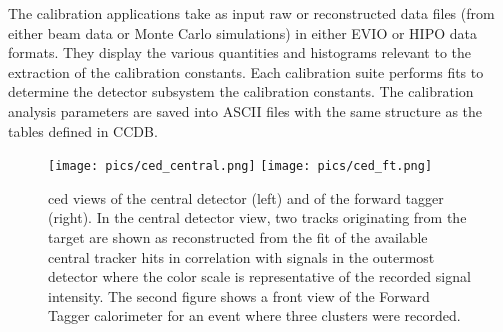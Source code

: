 The calibration applications take as input raw or reconstructed data files
(from either beam data or Monte Carlo simulations) in
either EVIO or HIPO data formats.  They display the various quantities and histograms relevant to the
extraction of the calibration constants.  Each calibration suite performs fits to determine the detector subsystem
the calibration constants.  The calibration analysis parameters are saved into ASCII files
with the same structure as the tables defined in CCDB.

\begin{figure*}
\centering
\texttt{[image: pics/ced\_central.png]}
\texttt{[image: pics/ced\_ft.png]}
\caption{ced views of the central detector (left) and of the forward tagger (right). In the central detector view, two tracks originating from the target are shown as reconstructed from the fit of the available central tracker hits in correlation with signals in the outermost detector where the color scale is representative of the recorded signal intensity. The second figure shows a front view of the Forward Tagger calorimeter for an event where three clusters were recorded.
}
\label{fig:ced}
\end{figure*}



